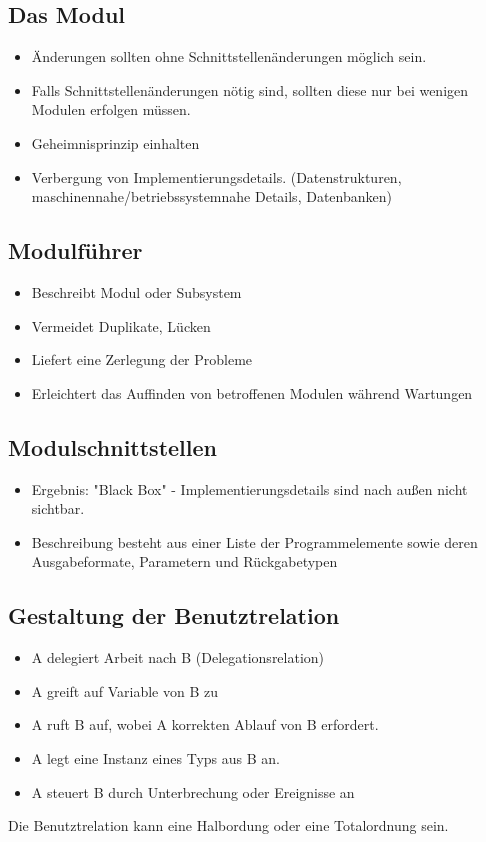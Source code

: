 \subsection{Das Modul}
\begin{itemize}
    \item Änderungen sollten ohne Schnittstellenänderungen möglich sein.
    \item Falls Schnittstellenänderungen nötig sind, sollten diese nur bei wenigen Modulen erfolgen müssen.
    \item Geheimnisprinzip einhalten
    \item Verbergung von Implementierungsdetails. (Datenstrukturen, maschinennahe/betriebssystemnahe Details, Datenbanken)
\end{itemize}

\subsection{Modulführer}
\begin{itemize}
    \item Beschreibt Modul oder Subsystem
    \item Vermeidet Duplikate, Lücken
     \item Liefert eine Zerlegung der Probleme
     \item Erleichtert das Auffinden von betroffenen Modulen während Wartungen
\end{itemize}

\subsection{Modulschnittstellen}
\begin{itemize}
    \item Ergebnis: "Black Box" - Implementierungsdetails sind nach außen nicht sichtbar.
    \item Beschreibung besteht aus einer Liste der Programmelemente sowie deren Ausgabeformate, Parametern und Rückgabetypen
\end{itemize}

\subsection{Gestaltung der Benutztrelation}
\begin{itemize}
    \item A delegiert Arbeit nach B (Delegationsrelation)
    \item A greift auf Variable von B zu
    \item A ruft B auf, wobei A korrekten Ablauf von B erfordert. 
    \item A legt eine Instanz eines Typs aus B an.
    \item A steuert B durch Unterbrechung oder Ereignisse an
\end{itemize}
Die Benutztrelation kann eine Halbordung oder eine Totalordnung sein.

